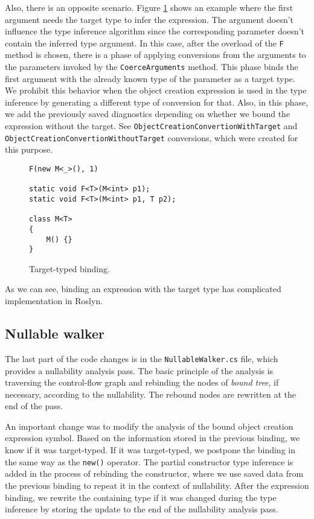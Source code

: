Also, there is an opposite scenario. 
Figure \ref{img72:targetBinding} shows an example where the first argument needs the target type to infer the expression. 
The argument doesn’t influence the type inference algorithm since the corresponding parameter doesn’t contain the inferred type argument. 
In this case, after the overload of the \texttt{F} method is chosen, there is a phase of applying conversions from the arguments to the parameters invoked by the \texttt{CoerceArguments} method. 
This phase binds the first argument with the already known type of the parameter as a target type.
We prohibit this behavior when the object creation expression is used in the type inference by generating a different type of conversion for that. 
Also, in this phase, we add the previously saved diagnostics depending on whether we bound the expression without the target. 
See \texttt{ObjectCreationConvertionWithTarget} and \texttt{ObjectCreationConvertionWithoutTarget} conversions, which were created for this purpose.
\begin{figure}[h]
\begin{lstlisting}[style=csharp, showstringspaces=false]
F(new M<_>(), 1)

static void F<T>(M<int> p1);
static void F<T>(M<int> p1, T p2);

class M<T> 
{
    M() {}
}
\end{lstlisting}
\caption{Target-typed binding.}
\label{img72:targetBinding}
\end{figure}
\par
As we can see, binding an expression with the target type has complicated implementation in Roslyn.

\subsection{Nullable walker}

The last part of the code changes is in the \texttt{NullableWalker.cs} file, which provides a nullability analysis pass. 
The basic principle of the analysis is traversing the control-flow graph and rebinding the nodes of \textit{bound tree}, if necessary, according to the nullability. 
The rebound nodes are rewritten at the end of the pass.
\par
An important change was to modify the analysis of the bound object creation expression symbol. 
Based on the information stored in the previous binding, we know if it was target-typed. 
If it was target-typed, we postpone the binding in the same way as the \texttt{new()} operator. 
The partial constructor type inference is added in the process of rebinding the constructor, where we use saved data from the previous binding to repeat it in the context of nullability. 
After the expression binding, we rewrite the containing type if it was changed during the type inference by storing the update to the end of the nullability analysis pass.